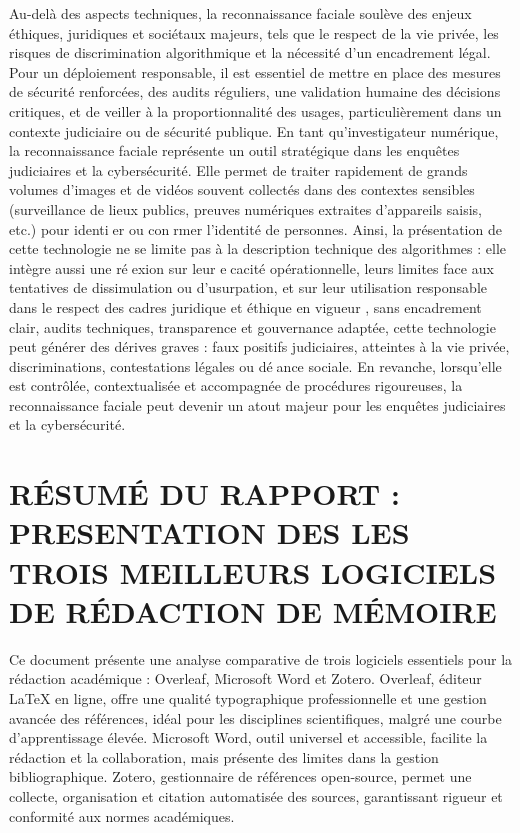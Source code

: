 \documentclass[12pt,a4paper]{article}
\begin{document}
{		Au-delà des aspects techniques, la reconnaissance faciale soulève des enjeux éthiques, juridiques et sociétaux majeurs, tels que le respect de la vie privée, les risques de discrimination algorithmique et la nécessité d'un encadrement légal. Pour un déploiement responsable, il est essentiel de mettre en place des mesures de sécurité renforcées, des audits réguliers, une validation humaine des décisions critiques, et de veiller à la proportionnalité des usages, particulièrement dans un contexte judiciaire ou de sécurité publique. En tant qu'investigateur numérique, la reconnaissance faciale représente un outil stratégique dans les enquêtes judiciaires et la cybersécurité. Elle permet de traiter rapidement de grands volumes d'images et de vidéos souvent collectés dans des contextes sensibles (surveillance de lieux publics, preuves numériques extraites d'appareils saisis, etc.) pour identier ou conrmer l'identité de personnes. Ainsi, la présentation de cette technologie ne se limite pas à la description technique des algorithmes : elle intègre aussi une réexion sur leur ecacité opérationnelle, leurs limites face aux
		tentatives de dissimulation ou d'usurpation, et sur leur utilisation responsable dans le respect des cadres juridique et éthique en vigueur , sans encadrement clair, audits techniques, transparence et gouvernance adaptée, cette technologie peut générer des dérives graves : faux positifs judiciaires, atteintes à la vie privée, discriminations, contestations légales ou déance sociale. En revanche, lorsqu'elle est contrôlée, contextualisée et accompagnée de procédures rigoureuses, la reconnaissance faciale peut devenir un atout majeur pour les enquêtes judiciaires et la cybersécurité.\\[2 cm]
		
		\section*{RÉSUMÉ DU RAPPORT : PRESENTATION DES LES TROIS MEILLEURS LOGICIELS DE RÉDACTION DE MÉMOIRE} Ce document présente une analyse comparative de trois logiciels essentiels pour la rédaction académique : Overleaf, Microsoft Word et Zotero. Overleaf, éditeur LaTeX en ligne, offre une qualité typographique professionnelle et une gestion avancée des références, idéal pour les disciplines scientifiques, malgré une courbe d’apprentissage élevée. Microsoft Word, outil universel et accessible, facilite la rédaction et la collaboration, mais présente des limites dans la gestion bibliographique. Zotero, gestionnaire de références open-source, permet une collecte, organisation et citation automatisée des sources, garantissant rigueur et conformité aux normes académiques.
		
}
\end{document}
